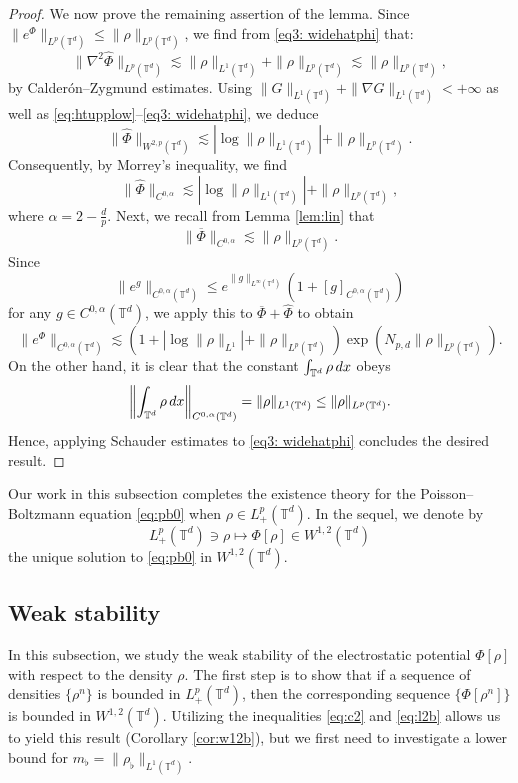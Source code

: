 \documentclass[11pt,reqno,a4paper]{amsart}
\newcommand{\intt}{\int_{\T^d}}
\theoremstyle{definition}
\theoremstyle{remark}
\numberwithin{equation}{section}
\newcommand{\T} {\mathbb T}
\newcommand{\lt}{\left}
\newcommand{\rt}{\right}
\newcommand{\bq}{\begin{equation}}
\newcommand{\eq}{\end{equation}}
\newcommand{\dx}{\textnormal{d}x}
\begin{document}
\begin{proof}
We now prove the remaining assertion of the lemma. Since $\|e^\Phi\|_{L^p(\T^d)} \le \|\rho\|_{L^{p}(\T^d)}$, we find from \eqref{eq3: widehatphi} that:
\[
\|\nabla^2 \widehat{\Phi}\|_{L^p(\T^d)} \lesssim \|\rho\|_{L^1(\T^d)} + \|\rho\|_{L^p(\T^d)} \lesssim  \|\rho\|_{L^p(\T^d)},
\]
by Calder\'on--Zygmund estimates. Using $\|G\|_{L^1(\T^d)} + \|\nabla G\|_{L^1(\T^d)} <+\infty$ as well as \eqref{eq:htupplow}--\eqref{eq3: widehatphi}, we deduce
\[
\|\widehat{\Phi}\|_{W^{2,p}(\T^d)} \lesssim  |\log \|\rho\|_{L^1(\T^d)}|  + \|\rho\|_{L^p(\T^d)} . 
\]
Consequently, by Morrey's inequality, we find
\[
\|\widehat{\Phi}\|_{C^{0,\alpha}} \lesssim  |\log \|\rho\|_{L^1(\T^d)}|  + \|\rho\|_{L^p(\T^d)},
\]
where $\alpha= 2- \frac{d}{p}$. Next, we recall from Lemma \ref{lem:lin} that
\[
\|\overline{\Phi}\|_{C^{0,\alpha}} \lesssim  \|\rho\|_{L^p(\T^d)}.
\]
Since
\[
\|e^{g}\|_{C^{0,\alpha}(\T^d)} \le e^{\|g\|_{L^\infty(\T^d)}}\lt(1+\lt[g\rt]_{C^{0,\alpha}(\T^d)}\rt)
\]
for any $g \in C^{0,\alpha}(\T^d)$, we apply this to $\overline{\Phi} + \widehat{\Phi}$ to obtain
\[
\|e^\Phi\|_{C^{0,\alpha}(\T^d)} \lesssim \lt(1 + | \log \|\rho\|_{L^1} | +  \|\rho\|_{L^p(\T^d)}\rt)\exp\lt({N_{p,d}\|\rho\|_{L^p(\T^d)}}\rt).
\]
On the other hand, it is clear that the constant $\intt \rho\,\dx$ obeys
\[
\lt\|\intt \rho\,\dx\rt\|_{C^{0,\alpha}(\T^d)} = \|\rho\|_{L^1(\T^d)} \le  \|\rho\|_{L^p(\T^d)}.
\]
Hence, applying Schauder estimates to \eqref{eq3: widehatphi} concludes the desired result.
\end{proof}

Our work in this subsection completes the existence theory for the Poisson--Boltzmann equation \eqref{eq:pb0} when $\rho \in L^p_+(\T^d)$. In the sequel, we denote by
\bq\label{eq:Phi:def}
L^p_+(\T^d) \ni \rho \mapsto \Phi[\rho] \in W^{1,2}(\T^d)
\eq
the unique solution to \eqref{eq:pb0} in $W^{1,2}(\T^d)$.

%
%
%
%
%
\subsection{Weak stability}
In this subsection, we study the weak stability of the electrostatic potential $\Phi[\rho]$ with respect to the density $\rho$. The first step is to show that if a sequence of densities $\{\rho^n\}$ is bounded in $L^p_+(\T^d)$, then the corresponding sequence $\{\Phi[\rho^n]\}$ is bounded in $W^{1,2}(\T^d)$. Utilizing the inequalities \eqref{eq:c2} and \eqref{eq:l2b} allows us to yield this result (Corollary \ref{cor:w12b}), but we first need to investigate a lower bound for $m_\flat = \|\rho_\flat\|_{L^1(\T^d)}$.
\end{document}
